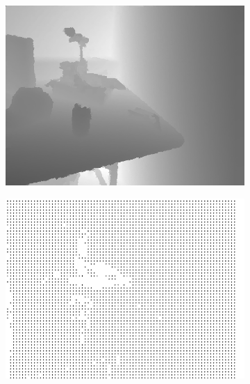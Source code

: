\documentclass[preprint,10pt,5p,times,twocolumn]{elsarticle}
\begin{document}
\begin{figure}[t]
\begin{center}
\begin{subfigure}[b]{0.136\linewidth}
    \includegraphics[width=\linewidth]{table_random_missing_inpainting.png}
\end{subfigure}
\begin{subfigure}[b]{0.136\linewidth}
    \includegraphics[width=\linewidth]{table_upsampling_depth.png}
\end{subfigure}
\begin{subfigure}[b]{0.136\linewidth}

\end{subfigure}
\end{center}
\end{figure}
\end{document}
